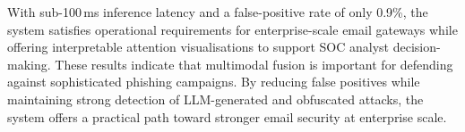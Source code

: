 \documentclass[conference]{IEEEtran}
\begin{document}
With sub-100\,ms inference latency and a false-positive rate of only 0.9\%, the system satisfies operational requirements for enterprise-scale email gateways while offering interpretable attention visualisations to support SOC analyst decision-making. These results indicate that multimodal fusion is important for defending against sophisticated phishing campaigns. By reducing false positives while maintaining strong detection of LLM-generated and obfuscated attacks, the system offers a practical path toward stronger email security at enterprise scale.



\end{document}
